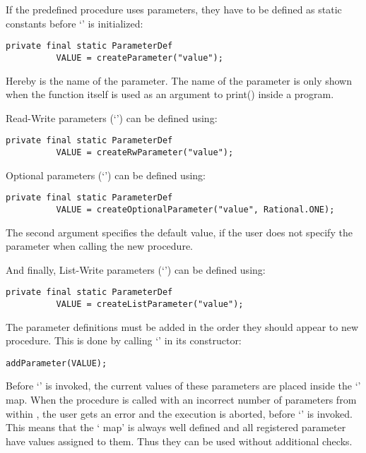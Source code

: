 
If the predefined procedure uses parameters, they have to be defined as static constants before
`' is initialized:
\begin{lstlisting}[frame=none,numbers=none]
private final static ParameterDef
          VALUE = createParameter("value");
\end{lstlisting}

Hereby  is the name of the parameter. The name of the parameter is only shown when the function itself is used as an argument to print() inside a \SetlX{} program.

Read-Write parameters (`') can be defined using:
\begin{lstlisting}[frame=none,numbers=none]
private final static ParameterDef
          VALUE = createRwParameter("value");
\end{lstlisting}

Optional parameters (`') can be defined using:
\begin{lstlisting}[frame=none,numbers=none]
private final static ParameterDef
          VALUE = createOptionalParameter("value", Rational.ONE);
\end{lstlisting}
The second argument specifies the default value, if the user does not specify the parameter when calling the new procedure.

And finally, List-Write parameters (`\command{*}') can be defined using:
\begin{lstlisting}[frame=none,numbers=none]
private final static ParameterDef
          VALUE = createListParameter("value");
\end{lstlisting}

The parameter definitions must be added in the order they should appear to new procedure. This is done by calling `' in its constructor:
\begin{lstlisting}[frame=none,numbers=none]
addParameter(VALUE);
\end{lstlisting}


Before `' is invoked, the current values of these parameters are placed inside the `' map.
When the procedure is called with an incorrect number of parameters from within \SetlX{}, the user gets an error and the execution is aborted, before `' is invoked.
This means that the ` map' is always well defined and all registered parameter have values assigned to them.
Thus they can be used without additional checks.

